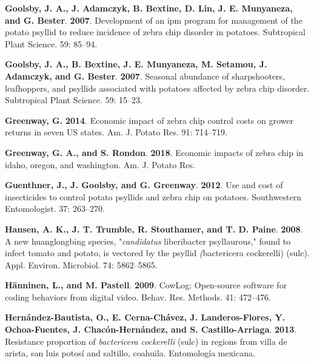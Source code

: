 \documentclass[]{article}
\begin{document}
\leavevmode\hypertarget{ref-Goolsby2007b}{}%
\textbf{Goolsby, J. A., J. Adamczyk, B. Bextine, D. Lin, J. E.
Munyaneza, and G. Bester}. \textbf{2007}. Development of an ipm program
for management of the potato psyllid to reduce incidence of zebra chip
disorder in potatoes. Subtropical Plant Science. 59: 85--94.

\leavevmode\hypertarget{ref-Goolsby2007a}{}%
\textbf{Goolsby, J. A., B. Bextine, J. E. Munyaneza, M. Setamou, J.
Adamczyk, and G. Bester}. \textbf{2007}. Seasonal abundance of
sharpshooters, leafhoppers, and psyllids associated with potatoes
affected by zebra chip disorder. Subtropical Plant Science. 59: 15--23.

\leavevmode\hypertarget{ref-Greenway2014}{}%
\textbf{Greenway, G.} \textbf{2014}. Economic impact of zebra chip
control costs on grower returns in seven US states. Am. J. Potato Res.
91: 714--719.

\leavevmode\hypertarget{ref-Greenway2018}{}%
\textbf{Greenway, G. A., and S. Rondon}. \textbf{2018}. Economic impacts
of zebra chip in idaho, oregon, and washington. Am. J. Potato Res.

\leavevmode\hypertarget{ref-Guenthner2012}{}%
\textbf{Guenthner, J., J. Goolsby, and G. Greenway}. \textbf{2012}. Use
and cost of insecticides to control potato psyllids and zebra chip on
potatoes. Southwestern Entomologist. 37: 263--270.

\leavevmode\hypertarget{ref-Hansen2008}{}%
\textbf{Hansen, A. K., J. T. Trumble, R. Stouthamer, and T. D. Paine}.
\textbf{2008}. A new huanglongbing species, "\emph{candidatus}
liberibacter psyllaurous," found to infect tomato and potato, is
vectored by the psyllid \emph{(}bactericera cockerelli) (sulc). Appl.
Environ. Microbiol. 74: 5862--5865.

\leavevmode\hypertarget{ref-Haenninen2009}{}%
\textbf{Hänninen, L., and M. Pastell}. \textbf{2009}. CowLog:
Open-source software for coding behaviors from digital video. Behav.
Res. Methods. 41: 472--476.

\leavevmode\hypertarget{ref-Hernandez-Bautista2013}{}%
\textbf{Hernández-Bautista, O., E. Cerna-Chávez, J. Landeros-Flores, Y.
Ochoa-Fuentes, J. Chacón-Hernández, and S. Castillo-Arriaga}.
\textbf{2013}. Resistance proportion of \emph{bactericera cockerelli}
(sulc) in regions from villa de arista, san luis potosí and saltillo,
coahuila. Entomología mexicana.
\end{document}
